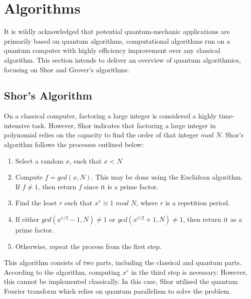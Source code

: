 \documentclass[12pt]{third-rep}
\begin{document}
\section{Algorithms}
It is wildly acknowledged that potential quantum-mechanic applications are primarily based on quantum algorithms, computational algorithms run on a quantum computer with highly efficiency improvement over any classical algorithm. This section intends to deliver an overview of quantum algorithmics, focusing on Shor and Grover's algorithms.

\subsection{Shor's Algorithm}
On a classical computer, factoring a large integer is considered a highly time-intensive task. However, Shor indicates that factoring a large integer in polynomial relies on the capacity to find the order of that integer $mod$ $N$. Shor's algorithm follows the processes outlined below:
\begin{enumerate}
\item Select a random $x$, such that $x < N$
\item Compute $f = gcd(x,N)$. This may be done using the Euclidean algorithm. If $f\neq1$, then return $f$ since it is a prime factor.
\item Find the least $r$ such that $x^r\equiv1$ $mod$ $N$, where $r$ is a repetition period.
\item If either $gcd(x^{r/2}-1,N)\neq1$ or $gcd(x^{r/2}+1,N)\neq1$, then return it as a prime factor.
\item Otherwise, repeat the process from the first step.
\end{enumerate}
This algorithm consists of two parts, including the classical and quantum parts. According to the algorithm, computing $x^r$ in the third step is necessary. However, this cannot be implemented classically. In this case, Shor utilised the quantum Fourier transform which relies on quantum parallelism to solve the problem.
\end{document}
